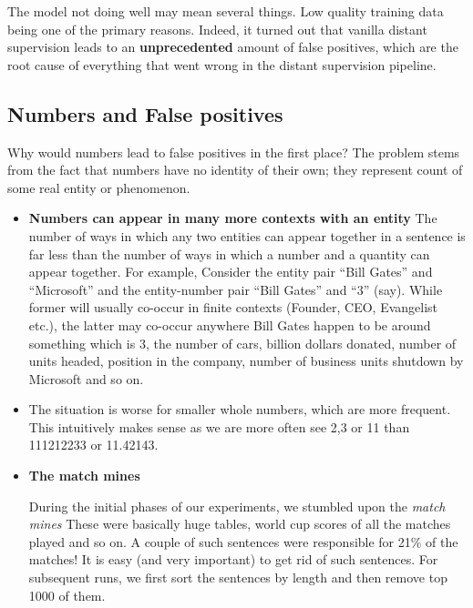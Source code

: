 \documentclass[a4paper,10pt]{article}
\begin{document}
The model not doing well may mean several things. Low quality training data being one of the primary reasons.
Indeed, it turned out that vanilla distant supervision leads to an \textbf{unprecedented} amount of false positives, which are the root cause
of everything that went wrong in the distant supervision pipeline.

\subsection{Numbers and False positives}
Why would numbers lead to false positives in the first place?
The problem stems from the fact that numbers have no identity of their own; they represent count of
some real entity or phenomenon.

\begin{itemize}
 \item \textbf{Numbers can appear in many more contexts with an entity}
The number of ways in which any two entities can appear together
in a sentence is far less than the number of ways in which a number and a quantity can appear
together. For example, Consider the entity pair “Bill Gates” and “Microsoft” and the entity-number
pair “Bill Gates” and “3” (say). While former will usually co-occur in finite contexts (Founder,
CEO, Evangelist etc.), the latter may co-occur anywhere Bill Gates happen to be around something
which is 3, the number of cars, billion dollars donated, number of units headed, position in the
company, number of business units shutdown by Microsoft and so on.
\item The situation is worse for smaller whole numbers, which are more frequent. This intuitively makes
sense as we are more often see 2,3 or 11 than 111212233 or 11.42143.
\item \textbf{The match mines}

During the initial phases of our experiments, we stumbled upon the \emph{match mines}
These were basically huge tables, world cup scores of all the matches played and so on.
A couple of such sentences were responsible for 21\% of the matches!
It is easy (and very important) to get rid of such sentences. For subsequent runs, we first sort the sentences by length and then remove
top 1000 of them.
\end{itemize}
\end{document}
